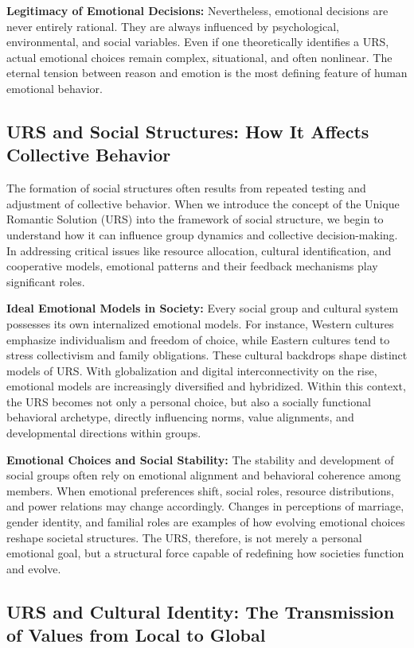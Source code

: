\documentclass[12pt]{article}
\begin{document}
\textbf{Legitimacy of Emotional Decisions:} Nevertheless, emotional decisions are never entirely rational. They are always influenced by psychological, environmental, and social variables. Even if one theoretically identifies a URS, actual emotional choices remain complex, situational, and often nonlinear. The eternal tension between reason and emotion is the most defining feature of human emotional behavior.

\subsection{URS and Social Structures: How It Affects Collective Behavior}

The formation of social structures often results from repeated testing and adjustment of collective behavior. When we introduce the concept of the Unique Romantic Solution (URS) into the framework of social structure, we begin to understand how it can influence group dynamics and collective decision-making. In addressing critical issues like resource allocation, cultural identification, and cooperative models, emotional patterns and their feedback mechanisms play significant roles.

\textbf{Ideal Emotional Models in Society:} Every social group and cultural system possesses its own internalized emotional models. For instance, Western cultures emphasize individualism and freedom of choice, while Eastern cultures tend to stress collectivism and family obligations. These cultural backdrops shape distinct models of URS. With globalization and digital interconnectivity on the rise, emotional models are increasingly diversified and hybridized. Within this context, the URS becomes not only a personal choice, but also a socially functional behavioral archetype, directly influencing norms, value alignments, and developmental directions within groups.

\textbf{Emotional Choices and Social Stability:} The stability and development of social groups often rely on emotional alignment and behavioral coherence among members. When emotional preferences shift, social roles, resource distributions, and power relations may change accordingly. Changes in perceptions of marriage, gender identity, and familial roles are examples of how evolving emotional choices reshape societal structures. The URS, therefore, is not merely a personal emotional goal, but a structural force capable of redefining how societies function and evolve.
\subsection{URS and Cultural Identity: The Transmission of Values from Local to Global}
\end{document}
